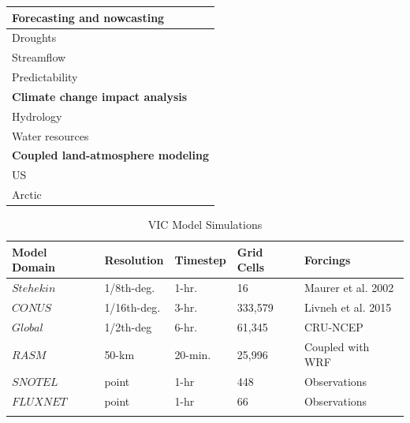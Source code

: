 \documentclass[gmd, manuscript]{copernicus}
\begin{document}
\begin{table}[]
{\begin{tabular}{ll}
    \multicolumn{2}{l}{\textbf{Forecasting and nowcasting}}                                                                                                         \\ \hline
    \multicolumn{1}{l|}{Droughts}                & \citet{Shukla_2011}  \\ \hline
    \multicolumn{1}{l|}{Streamflow}              & \citet{Hamlet_1999,Li_2009,Wood_2002}  \\ \hline
    \multicolumn{1}{l|}{Predictability}          & \citet{Gebregiorgis_2011,Maurer_2003}  \\ \hline
    \multicolumn{2}{l}{\textbf{Climate change impact analysis}}                                                                                                     \\ \hline
    \multicolumn{1}{l|}{Hydrology}               & \citet{Barnett_2005,Beyene_2010,Nijssen_2001b}  \\ \hline
    \multicolumn{1}{l|}{Water resources}         & \citet{Christensen_2007,Christensen_2004,Das_2011,Hamlet_1999}  \\ \hline
    \multicolumn{2}{l}{\textbf{Coupled land-atmosphere modeling}}                                                                                                     \\ \hline
    \multicolumn{1}{l|}{US}                      & \citet{Zhu_2009}                                           \\ \hline
    \multicolumn{1}{l|}{Arctic}                  & \citet{Hamman_2016a, Hamman_2016b} \\ \hline
  \end{tabular}
  }
\end{table}

\clearpage
\begin{table}
  \caption{VIC Model Simulations}
  \centering
  \begin{tabular}{l l l l l}
    \hline
    Model Domain  & Resolution  & Timestep  & Grid Cells  & Forcings  \\
    \hline
    $Stehekin$  & 1/8th-deg.   & 1-hr.   & 16      & Maurer et al. 2002    \\
    $CONUS$     & 1/16th-deg.  & 3-hr.   & 333,579 & Livneh et al. 2015   \\
    $Global$    & 1/2th-deg    & 6-hr.   & 61,345  & CRU-NCEP   \\
    $RASM$      & 50-km        & 20-min. & 25,996  & Coupled with WRF  \\
    $SNOTEL$    & point        & 1-hr    & 448     & Observations  \\
    $FLUXNET$   & point        & 1-hr    & 66      & Observations  \\
    \hline
    \label{table:model_sims}
  \end{tabular}
\end{table}
\end{document}
